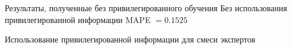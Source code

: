 \documentclass{beamer}
\begin{document}
\begin{frame}{Результаты, полученные без привилегированного обучения}
Без использования привилегированной информации MAPE $= 0.1525$
\begin{figure}[!htb]
      \end{figure}

\end{frame}


\begin{frame}{Использование привилегированной информации для смеси экспертов}

\begin{figure}[!htb]
\end{figure}


\end{frame}
\end{document}
